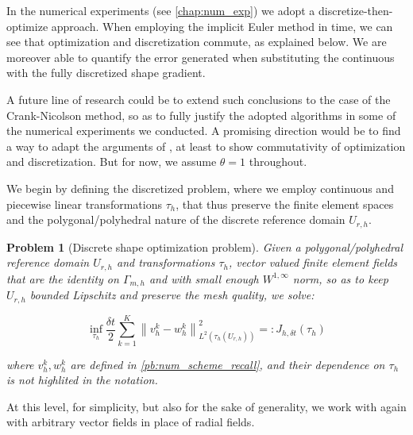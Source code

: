 \documentclass[english,a4paper,9pt,oneside]{scrbook}	%
\theoremstyle{break}
\newtheorem{pb}[equation]{Problem}
\theoremstyle{remark}
\newcommand{\norm}[1]{\left\lVert#1\right\rVert}
\begin{document}
In the numerical experiments (see \cref{chap:num_exp}) we adopt a discretize-then-optimize approach. When employing the implicit Euler method in time, we can see that optimization and discretization commute, as explained below. We are moreover able to quantify the error generated when substituting the continuous with the fully discretized shape gradient. 

A future line of research could be to extend such conclusions to the case of the Crank-Nicolson method, so as to fully justify the adopted algorithms in some of the numerical experiments we conducted. A promising direction would be to find a way to adapt the arguments of \cite{flaig}, at least to show commutativity of optimization and discretization. But for now, we assume $\theta = 1$ throughout.

We begin by defining the discretized problem, where we employ continuous and piecewise linear transformations $\tau_h$, that thus preserve the finite element spaces and the polygonal/polyhedral nature of the discrete reference domain $U_{r,h}$.

\begin{pb}[Discrete shape optimization problem]
\label{pb:discr_shopt}
Given a polygonal/polyhedral reference domain $U_{r,h}$ and transformations $\tau_h$, vector valued finite element fields that are the identity on $\Gamma_{m,h}$ and with small enough $W^{1,\infty}$ norm, so as to keep $U_{r,h}$ bounded Lipschitz and preserve the mesh quality, we solve:

$$\inf_{\tau_h }\frac{\delta t}{2}\sum_{k=1}^{K}\norm{v_h^k-w^k_h}_{L^2(\tau_h(U_{r,h}))}^2=:J_{h,\delta t}(\tau_h)$$


where $v_h^k, w^k_h$ are defined in \cref{pb:num_scheme_recall}, and their dependence on $\tau_h$ is not highlited in the notation.

\end{pb}

At this level, for simplicity, but also for the sake of generality, we work with again with arbitrary vector fields in place of radial fields.
\end{document}
